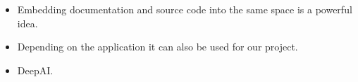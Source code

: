 \documentclass[11pt,a4paper]{article}
\begin{document}
\begin{paracol}{2}
\begin{itemize}
            \item Embedding documentation and source code into the same
space is a powerful idea.
    \end{itemize}

\begin{itemize}
            \item Depending on the application it can also be used for
our project.
    \end{itemize}


\begin{itemize}
            \item DeepAI.
    \end{itemize}


\end{paracol}
\end{document}
